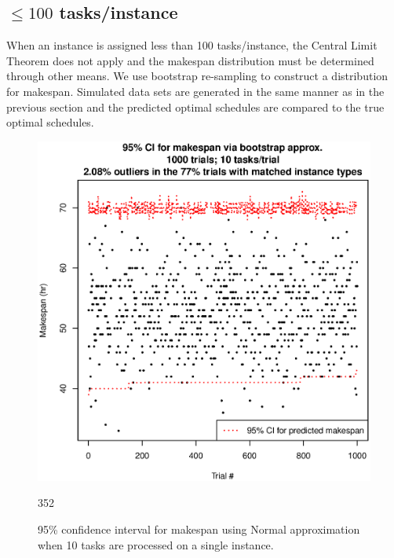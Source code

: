 \documentclass[12pt]{report}
\begin{document}
\subsection{$\leq 100$ tasks/instance}

When an instance is assigned less than 100 tasks/instance, the Central Limit Theorem does not apply and the makespan distribution must be determined through other means.
We use bootstrap re-sampling to construct a distribution for makespan.
Simulated data sets are generated in the same manner as in the previous section and the predicted optimal schedules are compared to the true optimal schedules.

\begin{figure}
\includegraphics[width=1\textwidth]{validate-stochastic-runtimes-1000-trials-10-tasks.eps}
\caption{95\% confidence interval for makespan using Normal approximation when 10 tasks are processed on a single instance.}352
\label{fig:validate-stochastic-runtimes-1000-trials-10-tasks}
\end{figure}
\end{document}
